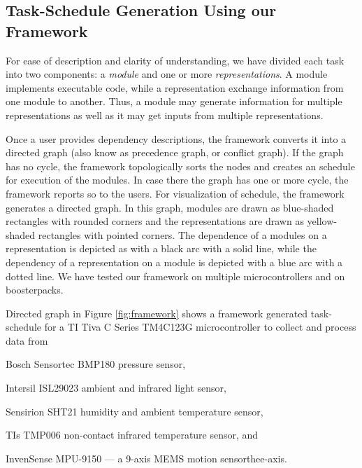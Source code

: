 \documentclass{IEEEtran}
\begin{document}
\subsection{Task-Schedule Generation Using our Framework}
\label{FrameWorkDescription}


 For ease of description and clarity of understanding, we have divided each task into two components: a {\em module} and one or more {\em representations}. A module implements executable code, while a representation exchange information from one module to another. Thus, a module may generate information for multiple representations as well as it may get inputs from multiple representations. 
\par
Once a user provides dependency descriptions, the framework converts it  into a directed graph (also know as precedence graph, or conflict graph).  If the graph has no cycle, the framework topologically sorts the nodes and creates an schedule for execution of the modules. In case there the graph has one or more cycle, the framework reports so to the users.
For visualization of schedule, the framework  generates a directed graph. In this graph, modules are drawn as blue-shaded rectangles with rounded corners and the representations are drawn as yellow-shaded rectangles with pointed corners. The dependence of a modules on a representation is depicted as with a black arc with a solid line, while the dependency of a representation on a module is depicted with a blue arc with a dotted line. We have tested our framework on multiple 
microcontrollers and on boosterpacks.

Directed graph in Figure \ref{fig:framework} shows a framework generated task-schedule for  a TI Tiva C Series TM4C123G microcontroller to collect and process data from \begin{inparaenum}[($i$)] \item Bosch Sensortec BMP180 pressure sensor, \item Intersil ISL29023 ambient and infrared light sensor, \item Sensirion SHT21 humidity and ambient temperature sensor,  \item  TIs TMP006 non-contact infrared temperature sensor, and \item InvenSense 
MPU-9150 --- a 9-axis MEMS motion sensorthee-axis. \end{inparaenum}
\end{document}
